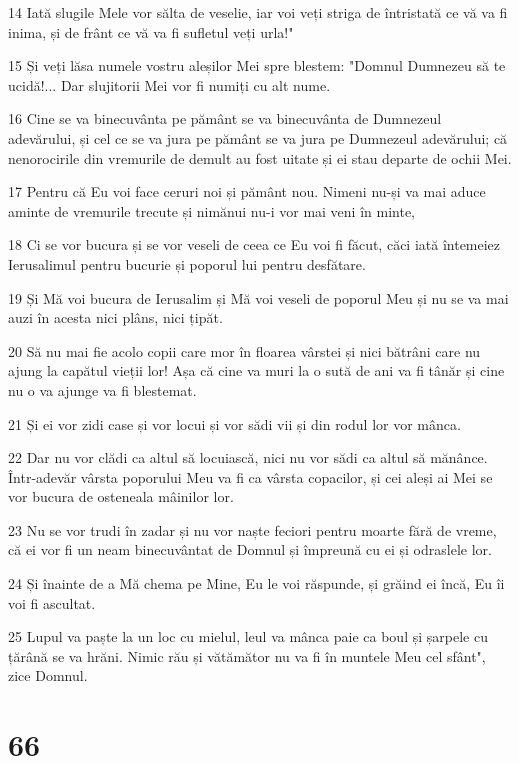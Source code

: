 \par 14 Iată slugile Mele vor sălta de veselie, iar voi veți striga de întristată ce vă va fi inima, și de frânt ce vă va fi sufletul veți urla!"
\par 15 Și veți lăsa numele vostru aleșilor Mei spre blestem: "Domnul Dumnezeu să te ucidă!... Dar slujitorii Mei vor fi numiți cu alt nume.
\par 16 Cine se va binecuvânta pe pământ se va binecuvânta de Dumnezeul adevărului, și cel ce se va jura pe pământ se va jura pe Dumnezeul adevărului; că nenorocirile din vremurile de demult au fost uitate și ei stau departe de ochii Mei.
\par 17 Pentru că Eu voi face ceruri noi și pământ nou. Nimeni nu-și va mai aduce aminte de vremurile trecute și nimănui nu-i vor mai veni în minte,
\par 18 Ci se vor bucura și se vor veseli de ceea ce Eu voi fi făcut, căci iată întemeiez Ierusalimul pentru bucurie și poporul lui pentru desfătare.
\par 19 Și Mă voi bucura de Ierusalim și Mă voi veseli de poporul Meu și nu se va mai auzi în acesta nici plâns, nici țipăt.
\par 20 Să nu mai fie acolo copii care mor în floarea vârstei și nici bătrâni care nu ajung la capătul vieții lor! Așa că cine va muri la o sută de ani va fi tânăr și cine nu o va ajunge va fi blestemat.
\par 21 Și ei vor zidi case și vor locui și vor sădi vii și din rodul lor vor mânca.
\par 22 Dar nu vor clădi ca altul să locuiască, nici nu vor sădi ca altul să mănânce. Într-adevăr vârsta poporului Meu va fi ca vârsta copacilor, și cei aleși ai Mei se vor bucura de osteneala mâinilor lor.
\par 23 Nu se vor trudi în zadar și nu vor naște feciori pentru moarte fără de vreme, că ei vor fi un neam binecuvântat de Domnul și împreună cu ei și odraslele lor.
\par 24 Și înainte de a Mă chema pe Mine, Eu le voi răspunde, și grăind ei încă, Eu îi voi fi ascultat.
\par 25 Lupul va paște la un loc cu mielul, leul va mânca paie ca boul și șarpele cu țărână se va hrăni. Nimic rău și vătămător nu va fi în muntele Meu cel sfânt", zice Domnul.

\chapter{66}

